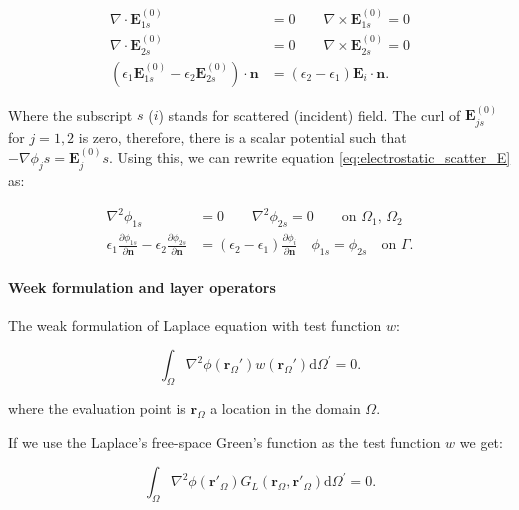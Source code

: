 \begin{align} \label{eq:electrostatic_scatter_E}
\nabla \cdot \mathbf{E}^{(0)}_{1s} &= 0 \qquad \nabla \times \mathbf{E}^{(0)}_{1s} = 0 \nonumber \\
\nabla \cdot \mathbf{E}^{(0)}_{2s} &= 0 \qquad \nabla \times \mathbf{E}^{(0)}_{2s} = 0 \nonumber \\
(\epsilon_1\mathbf{E}^{(0)}_{1s} - \epsilon_2\mathbf{E}^{(0)}_{2s})\cdot\mathbf{n} &= (\epsilon_2-\epsilon_1)\mathbf{E}_i\cdot \mathbf{n}.
\end{align}

Where the subscript $s$ ($i$) stands for scattered (incident) field. The curl of
$\mathbf{E}^{(0)}_{js}$ for $j=1,2$ is zero, therefore, there is a scalar potential
such that $-\nabla \phi_js = \mathbf{E}^{(0)}_js$. Using this, we can rewrite 
equation \eqref{eq:electrostatic_scatter_E} as:

\begin{align} \label{eq:electrostatic_scatter}
\nabla^2 \phi_{1s} &= 0 \qquad \nabla^2 \phi_{2s} = 0 \qquad\text{on $\Omega_1$, $\Omega_2$} \nonumber \\
\epsilon_1\frac{\partial\phi_{1s}}{\partial \mathbf{n}} - \epsilon_2\frac{\partial\phi_{2s}}{\partial\mathbf{n}} &= (\epsilon_2-\epsilon_1)\frac{\partial\phi_i}{\partial\mathbf{n}} \quad \phi_{1s} = \phi_{2s} \quad \text{on $\Gamma$}.
\end{align}

\paragraph{Week formulation and layer operators}


The weak formulation of Laplace equation with test function $w$:

\begin{equation} \label{eq:lap_weak}
\int_\Omega \nabla^2 \phi(\mathbf{r}_\Omega') w(\mathbf{r}_\Omega') \text{d} \Omega^\prime= 0.
\end{equation}

\noindent where the evaluation point is $\mathbf{r}_\Omega$ a location in the domain $\Omega$.

If we use the Laplace's free-space Green's function as the test function $w$ we
get:

\begin{equation} \label{eq:lap_weak2}
\int_\Omega \nabla^2 \phi(\mathbf{r}'_\Omega) G_L(\mathbf{r}_\Omega,\mathbf{r}'_\Omega) \text{d} \Omega^\prime= 0.
\end{equation}

